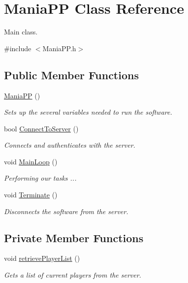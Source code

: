 \hypertarget{classManiaPP}{\section{Mania\-P\-P Class Reference}
\label{classManiaPP}
}


Main class.  




{\ttfamily \#include $<$Mania\-P\-P.\-h$>$}

\subsection*{Public Member Functions}
\begin{DoxyCompactItemize}
\item 
\hyperlink{classManiaPP_ae56f6623dc89f2c0b75bec631cfc2d19}{Mania\-P\-P} ()
\begin{DoxyCompactList}\small\item\em Sets up the several variables needed to run the software. \end{DoxyCompactList}\item 
bool \hyperlink{classManiaPP_a22561171876e54dbf633c70d9924c06a}{Connect\-To\-Server} ()
\begin{DoxyCompactList}\small\item\em Connects and authenticates with the server. \end{DoxyCompactList}\item 
void \hyperlink{classManiaPP_a8dff9e8e3835c3cac0df105a7bcce43c}{Main\-Loop} ()
\begin{DoxyCompactList}\small\item\em Performing our tasks ... \end{DoxyCompactList}\item 
void \hyperlink{classManiaPP_a87fd53fffe4a1840834a90ab575f5ce6}{Terminate} ()
\begin{DoxyCompactList}\small\item\em Disconnects the software from the server. \end{DoxyCompactList}\end{DoxyCompactItemize}
\subsection*{Private Member Functions}
\begin{DoxyCompactItemize}
\item 
void \hyperlink{classManiaPP_aede94c0b982250de19186d447542e479}{retrieve\-Player\-List} ()
\begin{DoxyCompactList}\small\item\em Gets a list of current players from the server. \end{DoxyCompactList}\end{DoxyCompactItemize}
